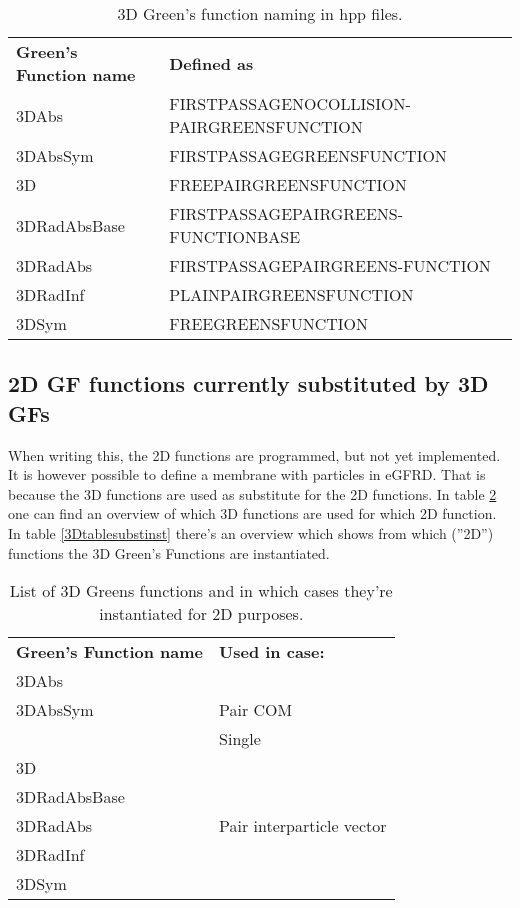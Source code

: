 \documentclass[a4paper,10pt]{article}
\begin{document}
\begin{table}[h!]
\caption{3D Green's function naming in hpp files.}
\label{3Dtableownnames}
\begin{tabular}{ p{} p{} }
  \textbf{Green's Function name} & \textbf{Defined as} \\
3DAbs 		 & FIRSTPASSAGENOCOLLISION\hyp{}PAIRGREENSFUNCTION \\ 		
3DAbsSym 	 & FIRSTPASSAGEGREENSFUNCTION \\
3D 		 & FREEPAIRGREENSFUNCTION \\
3DRadAbsBase 	 & FIRSTPASSAGEPAIRGREENS\hyp{}FUNCTIONBASE \\
3DRadAbs	 & FIRSTPASSAGEPAIRGREENS\hyp{}FUNCTION \\
3DRadInf 	 & PLAINPAIRGREENSFUNCTION \\
3DSym 		 & FREEGREENSFUNCTION \\
\end{tabular}
\end{table}

\subsection{2D GF functions currently substituted by 3D GFs}

When writing this, the 2D functions are programmed, but not yet implemented. It is however possible to define a membrane with particles in eGFRD. That is because the 3D functions are used as substitute for the 2D functions. In table \ref{3Dtablesubst} one can find an overview of which 3D functions are used for which 2D function. In table \ref{3Dtablesubstinst} there's an overview which shows from which (''2D'') functions the 3D Green's Functions are instantiated.

\begin{table}[h!]
\caption{List of 3D Greens functions and in which cases they're instantiated for 2D purposes.}
\label{3Dtablesubst}
\begin{tabular}{ p{} p{} }
  \textbf{Green's Function name} & \textbf{Used in case:} \\
3DAbs 		& \\
3DAbsSym 	& Pair COM\\
		& Single \\
3D 		& \\
3DRadAbsBase 	& \\
3DRadAbs	& Pair interparticle vector\\
3DRadInf 	& \\
3DSym 		& \\
\end{tabular}
\end{table}
\end{document}

